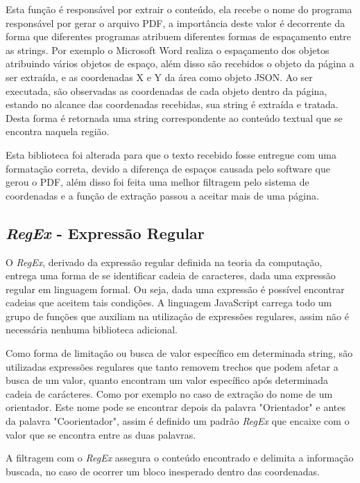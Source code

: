 Esta função é responsável por extrair o conteúdo, ela recebe o nome do programa responsável por gerar o arquivo PDF, a importância deste valor é decorrente da forma que diferentes programas atribuem diferentes formas de espaçamento entre as strings. Por exemplo o Microsoft Word realiza o espaçamento dos objetos atribuindo vários objetos de espaço, além disso são recebidos o objeto da página a ser extraída, e as coordenadas X e Y da área como objeto JSON. Ao ser executada, são observadas as coordenadas de cada objeto dentro da página, estando no alcance das coordenadas recebidas, sua string é extraída e tratada. Desta forma é retornada uma string correspondente ao conteúdo textual que se encontra naquela região.

Esta biblioteca foi alterada para que o texto recebido fosse entregue com uma formatação correta, devido a diferença de espaços causada pelo software que gerou o PDF, além disso foi feita uma melhor filtragem pelo sistema de coordenadas e a função de extração passou a aceitar mais de uma página.

\subsection{\textit{RegEx} - Expressão Regular}

O \textit{RegEx}, derivado da expressão regular definida na teoria da computação, entrega uma forma de se identificar cadeia de caracteres, dada uma expressão regular em linguagem formal. Ou seja, dada uma expressão é possível encontrar cadeias que aceitem tais condições. A linguagem JavaScript carrega todo um grupo de funções que auxiliam na utilização de expressões regulares, assim não é necessária nenhuma biblioteca adicional.

Como forma de limitação ou busca de valor específico em determinada string, são utilizadas expressões regulares que tanto removem trechos que podem afetar a busca de um valor, quanto encontram um valor específico após determinada cadeia de carácteres. Como por exemplo no caso de extração do nome de um orientador. Este nome pode se encontrar depois da palavra "Orientador" e antes da palavra 
"Coorientador", assim é definido um padrão \textit{RegEx} que encaixe com o valor que se encontra entre as duas palavras.

A filtragem com o \textit{RegEx} assegura o conteúdo encontrado e delimita a informação buscada, no caso de ocorrer um bloco inesperado dentro das coordenadas. 

